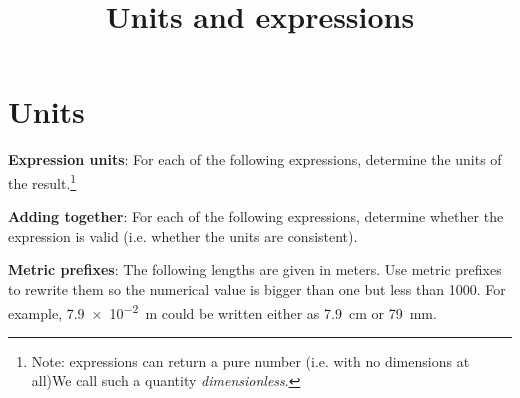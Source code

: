 \documentclass{handout}
\title{Units and expressions}
\begin{document}
\maketitle
\practiceinstructions

\section{Units}
\begin{questions}
  \question \textbf{Expression units}: For each of the following expressions, determine the units of the result.\footnote{Note: expressions can return a pure number (i.e. with no dimensions at all)We call such a quantity \emph{dimensionless}.}
  \question \textbf{Adding together}: For each of the following expressions, determine whether the expression is valid (i.e. whether the units are consistent).

  \question \textbf{Metric prefixes}: The following lengths are given in meters. Use metric prefixes to rewrite them so the numerical value is bigger than one but less than 1000. For example, \SI{7.9e-2}{m} could be written either as \SI{7.9}{cm} or \SI{79}{mm}.
  \begin{parts}

\end{parts}
\end{questions}
\end{document}
